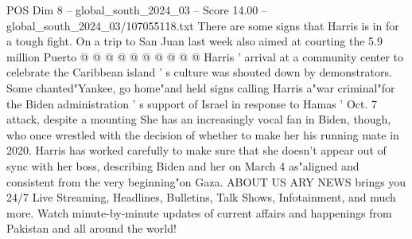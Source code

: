 \begin{textsample}{POS Dim 8 – global\_south\_2024\_03 – Score 14.00 – global\_south\_2024\_03/107055118.txt}
There are some signs that Harris is in for a tough fight.
On a trip to San Juan last week also aimed at courting the 5.9 million Puerto @ @ @ @ @ @ @ @ @ @ Harris ' arrival at a community center to celebrate the Caribbean island ' s culture was shouted down by demonstrators.
Some chanted"Yankee, go home"and held signs calling Harris a"war criminal"for the Biden administration ' s support of Israel in response to Hamas ' Oct. 7 attack, despite a mounting She has an increasingly vocal fan in Biden, though, who once wrestled with the decision of whether to make her his running mate in 2020.
Harris has worked carefully to make sure that she doesn't appear out of sync with her boss, describing Biden and her on March 4 as"aligned and consistent from the very beginning"on Gaza.
ABOUT US ARY NEWS brings you 24/7 Live Streaming, Headlines, Bulletins, Talk Shows, Infotainment, and much more.
Watch minute-by-minute updates of current affairs and happenings from Pakistan and all around the world!

\end{textsample}
